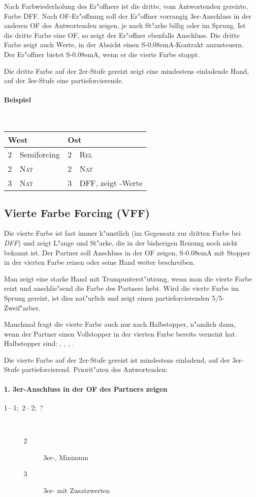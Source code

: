 \documentclass[11pt,german,twocolumn,twoside]{scrartcl}
\def\pi{\Sp\xspace}
\def\sa{\nobreak\textsf{S\kern-0.08emA}\xspace}
\def\ofa{\nobreak\textsf{OF}\xspace}
\def\pik{\nobreak\hspace{\cardskip}\Sp\xspace}
\def\coe{\nobreak\hspace{\cardskip}\He\xspace}
\def\kar{\nobreak\hspace{\cardskip}\Di\xspace}
\def\tre{\nobreak\hspace{\cardskip}\Cl\xspace}
\def\sep{\,--\,}
\newcommand{\conv}[1]{\emph{#1}}
\def\nat{\textsc{Nat}\xspace}
\def\rel{\textsc{Rel}\xspace}
\newcommand{\woreizung}[1]{%
\begin{minipage}{\columnwidth}
{\smaller\begin{tabularx}{\columnwidth}{rYrY}
\multicolumn{2}{l}{West} & \multicolumn{2}{l}{Ost}\\
\hline
#1
\end{tabularx}}
\end{minipage}
}
\begin{document}
Nach Farbwiederholung des Er"offners ist die dritte, vom Antwortenden gereizte,
Farbe DFF. Nach \ofa-Er"offnung soll der Er"offner vorrangig 3er-Anschluss in
der anderen \ofa des Antwortenden zeigen, je nach St"arke billig oder im
Sprung. Ist die dritte Farbe eine \ofa, so zeigt der Er"offner ebenfalls
Anschluss. Die dritte Farbe zeigt auch Werte, in der Absicht einen \sa-Kontrakt
anzusteuern. Der Er"offner bietet \sa, wenn er die vierte Farbe stoppt.

Die dritte Farbe auf der 2er-Stufe gereizt zeigt eine mindestens einladende
Hand, auf der 3er-Stufe eine partieforcierende.

\paragraph{Beispiel} ~

\woreizung{
  2\tre & Semiforcing & 2\kar & \rel \\
  2\coe & \nat & 2\tre & \nat \\
  3\coe & \nat & 3\pik & DFF, zeigt \pi-Werte
}

\subsection{Vierte Farbe Forcing (VFF)} \label{vff}

Die vierte Farbe ist fast immer k"unstlich (im Gegensatz zur dritten Farbe bei
\conv{DFF}) und zeigt L"ange und St"arke, die in der bisherigen Reizung noch
nicht bekannt ist. Der Partner soll Anschluss in der \ofa zeigen, \sa mit
Stopper in der vierten Farbe reizen oder seine Hand weiter beschreiben.

Man zeigt eine starke Hand mit Trumpunterst"utzung, wenn man die vierte
Farbe reizt und anschlie"send die Farbe des Partners hebt. Wird die vierte
Farbe im Sprung gereizt, ist dies nat"urlich und zeigt einen partieforcierenden
5/5-Zweif"arber.

Manchmal fragt die vierte Farbe auch nur nach Halbstopper, n"amlich dann, wenn
der Partner einen Vollstopper in der vierten Farbe bereits verneint hat.
Halbstopper sind: , , , .

Die vierte Farbe auf der 2er-Stufe gereizt ist mindestens einladend, auf der
3er-Stufe partieforcierend.
Priorit"aten des Antwortenden:

\paragraph{1. 3er-Anschluss in der \ofa des Partners zeigen}
\begin{description}
\item[1\coe{}\sep1\pik;~2\tre{}\sep2\kar;~?]~
  \begin{description}
    \item[2\pik] 3er-\pi, Minimum
    \item[3\pik] 3er-\pi mit Zusatzwerten
  \end{description}
\end{description}
\end{document}
